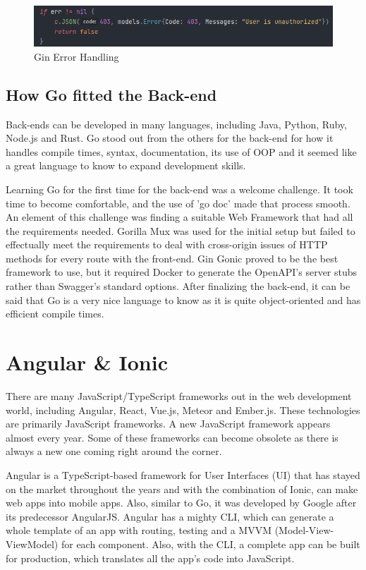 \begin{figure}[H]
    \caption{Gin Error Handling}
    \label{image:ginError}
    \centering
    \includegraphics[width=1.0\textwidth]{images/misc/cookie-error.png}
\end{figure}

\subsection{How Go fitted the Back-end}
Back-ends can be developed in many languages, including Java, Python, Ruby, Node.js and Rust. Go stood out from the others for the back-end for how it handles compile times, syntax, documentation, its use of OOP and it seemed like a great language to know to expand development skills. 

Learning Go for the first time for the back-end was a welcome challenge. It took time to become comfortable, and the use of 'go doc' made that process smooth. An element of this challenge was finding a suitable Web Framework that had all the requirements needed. Gorilla Mux was used for the initial setup but failed to effectually meet the requirements to deal with cross-origin issues of HTTP methods for every route with the front-end.
Gin Gonic proved to be the best framework to use, but it required Docker to generate the OpenAPI's server stubs rather than Swagger's standard options. After finalizing the back-end, it can be said that Go is a very nice language to know as it is quite object-oriented and has efficient compile times. 
 
\section{Angular \& Ionic}
There are many JavaScript/TypeScript frameworks out in the web development world, including Angular, React, Vue.js, Meteor and Ember.js. These technologies are primarily JavaScript frameworks. A new JavaScript framework appears almost every year. Some of these frameworks can become obsolete as there is always a new one coming right around the corner.

Angular is a TypeScript-based framework for User Interfaces (UI) that has stayed on the market throughout the years \cite{ref14} and with the combination of Ionic, can make web apps into mobile apps. Also, similar to Go, it was developed by Google after its predecessor AngularJS. Angular has a mighty CLI, which can generate a whole template of an app with routing, testing and a MVVM (Model-View-ViewModel) for each component. Also, with the CLI, a complete app can be built for production, which translates all the app's code into JavaScript.

